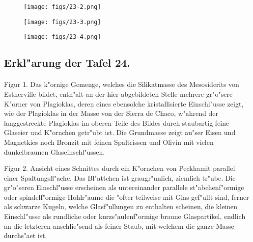 \documentclass[a4paper, 11pt, oneside, polutonikogreek, german]{article}
\begin{document}
\vspace*{\fill}
\begin{figure}[H]
\centering
\texttt{[image: figs/23-2.png]}
\caption{}
\end{figure}
\vspace*{\fill}
\clearpage

\vspace*{\fill}
\begin{figure}[H]
\centering
\texttt{[image: figs/23-3.png]}
\caption{}
\end{figure}
\vspace*{\fill}
\clearpage

\vspace*{\fill}
\begin{figure}[H]
\centering
\texttt{[image: figs/23-4.png]}
\caption{}
\end{figure}
\vspace*{\fill}
\clearpage

\subsection{Erkl"arung der Tafel 24.}
\paragraph{}
Figur 1. Das k"ornige Gemenge, welches die Silikatmasse des Mesosiderits von Estherville bildet, enth"alt an der hier abgebildeten Stelle mehrere gr"o"sere K"orner von Plagioklas, deren eines ebensolche kristallisierte Einschl"usse zeigt, wie der Plagioklas in der Masse von der Sierra de Chaco, w"ahrend der langgestreckte Plagioklas im oberen Teile des Bildes durch staubartig feine Glaseier und K"ornchen getr"ubt ist. Die Grundmasse zeigt au"ser Eisen und Magnetkies noch Bronzit mit feinen Spaltrissen und Olivin mit vielen dunkelbraunen Glaseinschl"ussen.

Figur 2. Ansicht eines Schnittes durch ein K"ornchen von Peckhamit parallel einer Spaltungsfl"ache. Das Bl"attchen ist graugr"unlich, ziemlich tr"ube. Die gr"o"seren Einschl"usse erscheinen als untereinander parallele st"abchenf"ormige oder spindelf"ormige Hohlr"aume die "ofter teilweise mit Glas gef"ullt sind, ferner als schwarze Kugeln, welche Glasf"ullungen zu enthalten scheinen, die kleinen Einschl"usse als rundliche oder kurzs"aulenf"ormige braune Glaspartikel, endlich an die letzteren anschlie"send als feiner Staub, mit welchem die ganze Masse durchs"aet ist.
\end{document}
